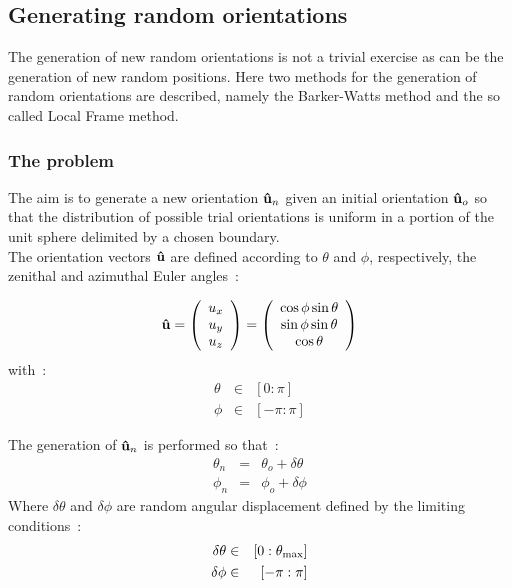 \subsection{Generating random orientations}


The generation of new random orientations is not a trivial exercise as can be the generation of
new random positions. Here two methods for the generation of random orientations are described,
namely the Barker-Watts method and the so called Local Frame method.

\subsubsection{The problem}

The aim is to generate a new orientation $\mathbf{\hat{u} }_n$ given an initial orientation
$\mathbf{\hat{u} }_o$  so that the distribution of possible trial orientations is uniform in a 
portion of the unit sphere delimited by a chosen boundary.\\
The orientation vectors $\mathbf{\hat{u} }$ are defined according to $\theta$ and $\phi$,
respectively, the zenithal and azimuthal Euler angles~:

\begin{equation}
	\mathbf{\hat{u} } =
	\left(
	\begin{array}{c}
		u_x\\	u_y\\	u_z
	\end{array}
	\right)
	=
	\left(
	\begin{array}{c}
		\cos\phi\sin\theta	\\
        	\sin\phi\sin\theta	\\
		\cos\theta
	\end{array}
	\right)
\end{equation}
%
with~:
%
\begin{eqnarray*}
	\theta 	&\in& 	[0:\pi]	\\
        \phi 	&\in&	[-\pi:\pi]
\end{eqnarray*}

The generation of $\mathbf{\hat{u} }_n$ is performed so that~:
\begin{eqnarray}
	\theta_{n} 	&=& \theta_o + \delta\theta	\\
        \phi_{n}	&=& \phi_o + \delta\phi
\end{eqnarray}
Where $\delta\theta$ and $\delta\phi$ are random angular displacement defined by the limiting 
conditions~:
\begin{eqnarray*}
	\delta\theta 	&\in& 	[0:\theta_{\mathrm{max}}]	\\
        \delta\phi 		&\in&	[-\pi:\pi]
\end{eqnarray*}

